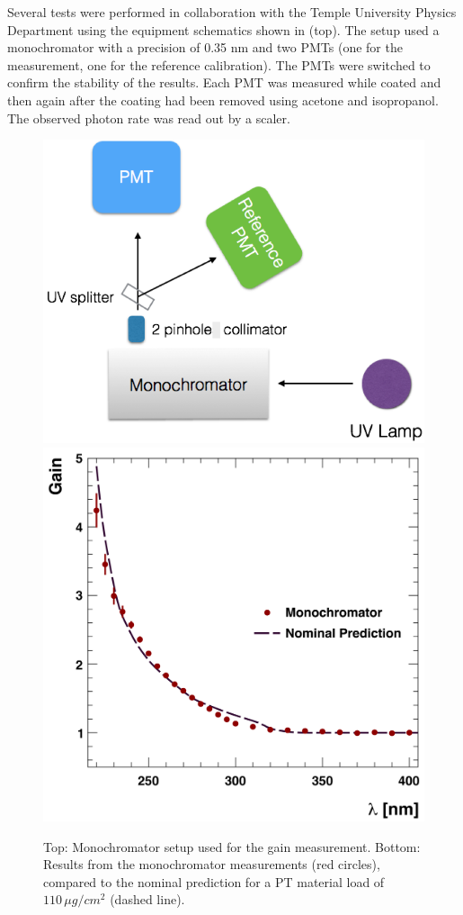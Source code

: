 Several tests were performed in collaboration with the Temple University Physics Department using the equipment schematics
shown in  (top). The setup used a monochromator with a precision of 0.35 nm and two PMTs (one for the measurement,
one for the   reference calibration). The PMTs were switched to confirm the stability of the results. Each PMT was measured
while coated and then again after the coating had been removed using acetone and isopropanol.
The observed photon rate was read out by a scaler.

\begin{figure}
	\centering
	\includegraphics[width=0.95\columnwidth, height=0.65\columnwidth]{img/pmtTestingSetup.png}
	\includegraphics[width=0.99\columnwidth, height=0.65\columnwidth]{img/ptQEResults.png}
	\caption{Top: Monochromator setup used for the gain measurement. Bottom: Results from the monochromator measurements (red circles), compared to the
				nominal prediction for a PT material load of $110\,\mu g/cm^2$ (dashed line).}
	\label{fig:pmtTestingSetupAndptQEResults}
\end{figure}

